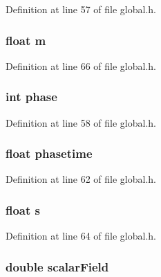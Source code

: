 Definition at line 57 of file global.\-h.

\hypertarget{structcellData_ac51334f57ef8b81c0629c9421798c344}{
\subsubsection[{m}]{\setlength{\rightskip}{0pt plus 5cm}float m}}\label{structcellData_ac51334f57ef8b81c0629c9421798c344}


Definition at line 66 of file global.\-h.

\hypertarget{structcellData_accf3aec63bc20b3c99ab4881cb07c05b}{
\subsubsection[{phase}]{\setlength{\rightskip}{0pt plus 5cm}int phase}}\label{structcellData_accf3aec63bc20b3c99ab4881cb07c05b}


Definition at line 58 of file global.\-h.

\hypertarget{structcellData_afe1297f954440c453b59fcb06992dbd5}{
\subsubsection[{phasetime}]{\setlength{\rightskip}{0pt plus 5cm}float phasetime}}\label{structcellData_afe1297f954440c453b59fcb06992dbd5}


Definition at line 62 of file global.\-h.

\hypertarget{structcellData_a874f74a4dc1c9a0cd9c6e0d79c298f55}{
\subsubsection[{s}]{\setlength{\rightskip}{0pt plus 5cm}float s}}\label{structcellData_a874f74a4dc1c9a0cd9c6e0d79c298f55}


Definition at line 64 of file global.\-h.

\hypertarget{structcellData_a0045a5036d7f3f873fe33380932d4313}{
\subsubsection[{scalar\-Field}]{\setlength{\rightskip}{0pt plus 5cm}double scalar\-Field}}\label{structcellData_a0045a5036d7f3f873fe33380932d4313}


